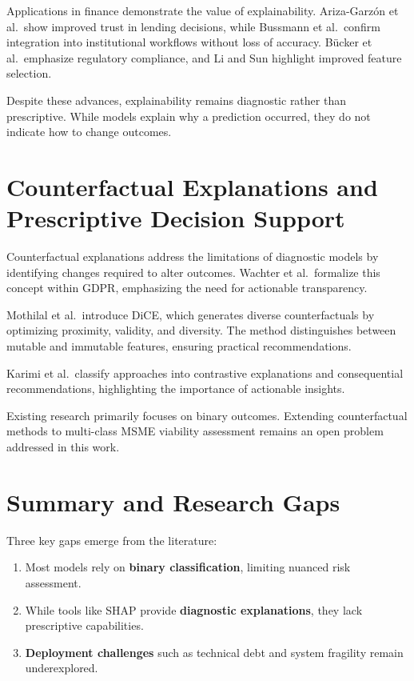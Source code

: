 \documentclass[12pt,a4paper]{report}
\begin{document}
Applications in finance demonstrate the value of explainability. Ariza-Garz\'{o}n et al.\ show improved trust in lending decisions, while Bussmann et al.\ confirm integration into institutional workflows without loss of accuracy. B\"{u}cker et al.\ emphasize regulatory compliance, and Li and Sun highlight improved feature selection.

Despite these advances, explainability remains diagnostic rather than prescriptive. While models explain why a prediction occurred, they do not indicate how to change outcomes.

\section{Counterfactual Explanations and Prescriptive Decision Support}

Counterfactual explanations address the limitations of diagnostic models by identifying changes required to alter outcomes. Wachter et al.\ formalize this concept within GDPR, emphasizing the need for actionable transparency.

Mothilal et al.\ introduce DiCE, which generates diverse counterfactuals by optimizing proximity, validity, and diversity. The method distinguishes between mutable and immutable features, ensuring practical recommendations.

Karimi et al.\ classify approaches into contrastive explanations and consequential recommendations, highlighting the importance of actionable insights.

Existing research primarily focuses on binary outcomes. Extending counterfactual methods to multi-class MSME viability assessment remains an open problem addressed in this work.

\section{Summary and Research Gaps}

Three key gaps emerge from the literature:
\begin{enumerate}
    \item Most models rely on \textbf{binary classification}, limiting nuanced risk assessment.
    \item While tools like SHAP provide \textbf{diagnostic explanations}, they lack prescriptive capabilities.
    \item \textbf{Deployment challenges} such as technical debt and system fragility remain underexplored.
\end{enumerate}
\end{document}
